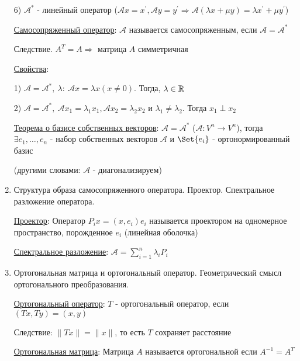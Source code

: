 \documentclass[12pt]{article}
\begin{document}
\begin{enumerate}
        6) $\mathcal{A}^*$ - линейный оператор ($\mathcal{A}x = x^\prime, \mathcal{A}y = y^\prime \Longrightarrow \mathcal{A}(\lambda x + \mu y) = \lambda x^\prime + \mu y^\prime$)

        \hyperlink{selfconjugateoperator}{Самосопряженный оператор}: $\mathcal{A}$ называется самосопряженным, если $\mathcal{A} = \mathcal{A}^*$

        Следствие. $A^T = A \Longrightarrow$ матрица $A$ симметричная

        \hyperlink{selfconjugateoperatorproperties}{Свойства}:

        1) $\mathcal{A} = \mathcal{A}^*, \ \lambda : \ \mathcal{A}x = \lambda x (x \neq 0)$. Тогда, $\lambda \in \mathbb{R}$

        2) $\mathcal{A} = \mathcal{A}^*, \ \mathcal{A}x_1 = \lambda_1 x_1, \mathcal{A}x_2 = \lambda_2 x_2$ и $\lambda_1 \neq \lambda_2$. Тогда $x_1 \perp x_2$

        \hyperlink{theoremabouteigenvectorsinselfconjugateoperator}{Теорема о базисе собственных векторов}: $\mathcal{A} = \mathcal{A}^*$ ($\mathcal{A} : V^n \to V^n$),
        тогда $\exists e_1, \dots, e_n$ - набор собственных векторов $\mathcal{A}$ и $\Set{e_i}$ - ортонормированный базис

        (другими словами: $\mathcal{A}$ - диагонализируем)

        \item Структура образа самосопряженного оператора. Проектор. Спектральное разложение оператора.

        \hyperlink{projector}{Проектор}: Оператор $P_i x = (x, e_i) e_i$ называется проектором на одномерное пространство, порожденное $e_i$ (линейная оболочка)

        \hyperlink{spectraldecomposition}{Спектральное разложение}: $\mathcal{A} = \sum_{i = 1}^{n} \lambda_i P_i$

        \item Ортогональная матрица и ортогональный оператор. Геометрический смысл ортогонального преобразования.

        \hyperlink{orthogonaloperator}{Ортогональный оператор}: $T$ - ортогональный оператор, если $(Tx, Ty) = (x, y)$

        Следствие: $\|Tx\| = \|x\|$, то есть $T$ сохраняет расстояние

        \hyperlink{orthogonalmatrix}{Ортогональная матрица}: Матрица $A$ называется ортогональной если $A^{-1} = A^T$




\end{enumerate}
\end{document}
